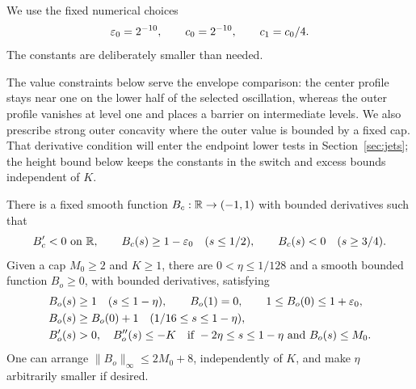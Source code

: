 We use the fixed numerical choices
\begin{equation}
 \varepsilon_0=2^{-10},\qquad c_0=2^{-10},\qquad c_1=c_0/4.
 \label{sc:numerical}
\end{equation}
The constants are deliberately smaller than needed.

The value constraints below serve the envelope comparison: the center
profile stays near one on the lower half of the selected oscillation,
whereas the outer profile vanishes at level one and places a barrier
on intermediate levels. We also prescribe strong outer concavity
where the outer value is bounded by a fixed cap. That derivative
condition will enter the endpoint lower tests in
Section~\ref{sec:jets}; the height bound below keeps the constants in
the switch and excess bounds independent of $K$.

\begin{lemma}\label{sc:templates}
There is a fixed smooth function $B_c:\mathbb R\to(-1,1)$ with bounded
derivatives such that
\[
 B_c'<0\text{ on }\mathbb R,\qquad
 B_c(s)\geq1-\varepsilon_0\quad(s\leq1/2),\qquad
 B_c(s)<0\quad(s\geq3/4).
\]
Given a cap $M_0\geq2$ and $K\geq1$, there are
$0<\eta\leq1/128$ and a smooth bounded function $B_o\geq0$, with
bounded derivatives, satisfying
\begin{align}
 &B_o(s)\geq1\quad(s\leq1-\eta),\qquad
 B_o(1)=0,\qquad 1\leq B_o(0)\leq1+\varepsilon_0,       \label{sc:outer-values}\\
 &B_o(s)\geq B_o(0)+1
       \quad(1/16\leq s\leq1-\eta),            \label{sc:barrier}\\
 &B_o'(s)>0,\quad B_o''(s)\leq-K
       \quad\text{if }-2\eta\leq s\leq1-\eta
                      \text{ and }B_o(s)\leq M_0.     \label{sc:curvature}
\end{align}
One can arrange $\|B_o\|_\infty\leq2M_0+8$, independently of $K$,
and make $\eta$ arbitrarily smaller if desired.
\end{lemma}

